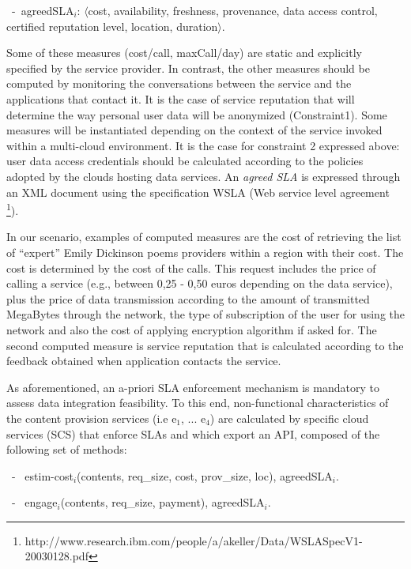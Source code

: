 
\begin{trivlist}\sf\footnotesize
\item[~-~agreedSLA$_i$:] $\langle$cost, availability, freshness, provenance, data access control, certified reputation level, location, duration$\rangle$. 
 \end{trivlist}
 
Some of these measures ({cost/call, maxCall/day}) are static and explicitly specified by the service provider. 
In contrast, the other measures should be computed by monitoring the conversations between the service and the applications that contact it.  It is the case of service reputation that will determine the way personal user data will be anonymized (Constraint1).  Some measures will be instantiated depending on the context of  the service invoked within a multi-cloud environment. It is the case for constraint 2 expressed above:   user data access credentials should be calculated according to the policies adopted by the clouds  hosting  data services.
An \textit{agreed SLA} is expressed through an  XML document using the specification WSLA (Web service level agreement \footnote{\footnotesize http://www.research.ibm.com/people/a/akeller/\-Data/WSLASpecV1-20030128.pdf}).

In our scenario, examples of computed measures are the cost of retrieving the list of ``expert'' Emily Dickinson poems providers within a region with their cost. 
The cost is determined by the  cost of the calls. 
This request  includes the price of calling a service (e.g.,  between 0,25 - 0,50 euros depending on the data service), plus the price of data transmission according to the amount of transmitted MegaBytes through the network, the type of subscription of the user for using the network and also the cost of applying encryption algorithm if asked for. The second computed measure is service reputation that is calculated according to the feedback obtained when application contacts the service.


As aforementioned, an a-priori SLA enforcement mechanism is mandatory to assess data integration feasibility.
To this end, non-functional characteristics of the content provision services ({i.e e$_1$, ... e$_4$}) are calculated by specific cloud services (SCS) that enforce SLAs  and which export  an API, composed of the following set of methods:

 
\begin{trivlist}\sf\footnotesize
\item[~-~]estim-cost$_i$(contents, req\_size, cost, prov\_size, loc), 
agreedSLA$_i$.

\item[~-~]engage$_i$(contents, req\_size, payment), agreedSLA$_i$.
\end{trivlist}

